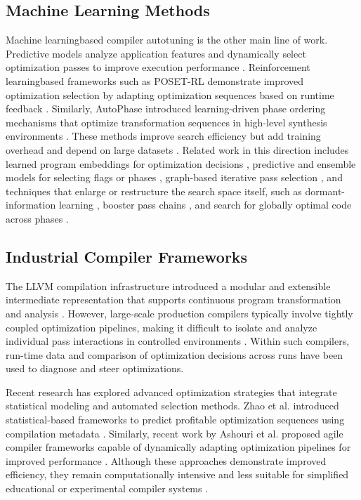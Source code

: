 \documentclass[conference]{IEEEtran}
\begin{document}
\subsection{Machine Learning Methods}
Machine learning\textendash based compiler autotuning is the other main line of work. Predictive models analyze application features and dynamically select optimization passes to improve execution performance \cite{ref8}. Reinforcement learning\textendash based frameworks such as POSET-RL demonstrate improved optimization selection by adapting optimization sequences based on runtime feedback \cite{ref8}. Similarly, AutoPhase introduced learning-driven phase ordering mechanisms that optimize transformation sequences in high-level synthesis environments \cite{ref12}. These methods improve search efficiency but add training overhead and depend on large datasets \cite{ref12}. Related work in this direction includes learned program embeddings for optimization decisions \cite{ref9}, predictive and ensemble models for selecting flags or phases \cite{ref17,ref22,ref28,ref29}, graph-based iterative pass selection \cite{ref20}, and techniques that enlarge or restructure the search space itself, such as dormant-information learning \cite{ref26}, booster pass chains \cite{ref25}, and search for globally optimal code across phases \cite{ref3}.

\subsection{Industrial Compiler Frameworks}
The LLVM compilation infrastructure introduced a modular and extensible intermediate representation that supports continuous program transformation and analysis \cite{ref16}. However, large-scale production compilers typically involve tightly coupled optimization pipelines, making it difficult to isolate and analyze individual pass interactions in controlled environments \cite{ref16}. Within such compilers, run-time data \cite{ref23} and comparison of optimization decisions across runs \cite{ref24} have been used to diagnose and steer optimizations.

Recent research has explored advanced optimization strategies that integrate statistical modeling and automated selection methods. Zhao et al. introduced statistical-based frameworks to predict profitable optimization sequences using compilation metadata \cite{ref7}. Similarly, recent work by Ashouri et al. proposed agile compiler frameworks capable of dynamically adapting optimization pipelines for improved performance \cite{ref27}. Although these approaches demonstrate improved efficiency, they remain computationally intensive and less suitable for simplified educational or experimental compiler systems \cite{ref27}.
\end{document}
